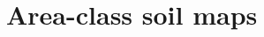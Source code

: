 % 
% 
% 
% 
% 
% 
% 
% 
% 
\tocless\section{Area-class soil maps}
\label{sec:covar-data-soil-maps}

